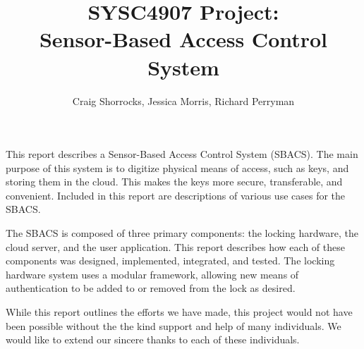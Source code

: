 \documentclass[12pt]{report}
\begin{document}
\title{SYSC4907 Project: \\ Sensor-Based Access Control System}
\author{
    Craig Shorrocks,
    Jessica Morris,
    Richard Perryman
}

\copyrightfalse %

\beforepreface



This report describes a Sensor-Based Access Control System (SBACS). The main purpose of this system is to digitize 
physical means of access, such as keys, and storing them in the cloud. This makes the keys more secure, transferable, 
and convenient. Included in this report are descriptions of various use cases for the SBACS.

The SBACS is composed of three primary components: the locking hardware, the cloud server, and the user application. 
This report describes how each of these components was designed, implemented, integrated, and tested. The locking 
hardware system uses a modular framework, allowing new means of authentication to be added to or removed from the lock 
as desired.



While this report outlines the efforts we have made, this project would not have been possible without the the kind 
support and help of many individuals. We would like to extend our sincere thanks to each of these individuals.
\end{document}
